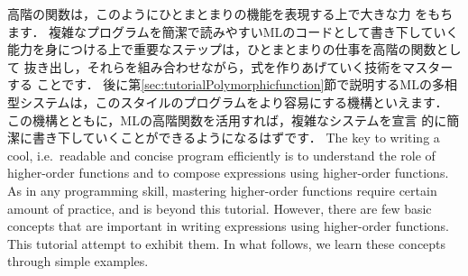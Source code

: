 \documentclass{jbook}
\begin{document}
	高階の関数は，このようにひとまとまりの機能を表現する上で大きな力
をもちます．
	複雑なプログラムを簡潔で読みやすいMLのコードとして書き下していく
能力を身につける上で重要なステップは，ひとまとまりの仕事を高階の関数として
抜き出し，それらを組み合わせながら，式を作りあげていく技術をマスターする
ことです．
	後に第\ref{sec:tutorialPolymorphicfunction}節で説明するMLの多相
型システムは，このスタイルのプログラムをより容易にする機構といえます．
	この機構とともに，MLの高階関数を活用すれば，複雑なシステムを宣言
的に簡潔に書き下していくことができるようになるはずです．
\else%
	The key to writing a cool, i.e.\ readable and concise program
efficiently is to understand the role of higher-order functions
and to compose expressions using higher-order functions.
	As in any programming skill, mastering higher-order functions
require certain amount of practice, and is beyond this tutorial.
	However, there are few basic concepts that are important in
writing expressions using higher-order functions.
	This tutorial attempt to exhibit them.
	In what follows, we learn these concepts through simple
examples.
\end{document}
